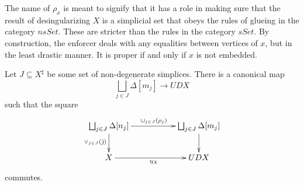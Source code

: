 The name of $\rho _x$ is meant to signify that it has a role in making sure that the result of desingularizing $X$ is a simplicial set that obeys the rules of glueing in the category $nsSet$. These are stricter than the rules in the category $sSet$. By construction, the enforcer deals with any equalities between vertices of $x$, but in the least drastic manner. It is proper if and only if $x$ is not embedded.
\begin{proposition}\label{prop:role_of_enforcers}
Let $J\subseteq X^\sharp$ be some set of non-degenerate simplices. There is a canonical map
\[\bigsqcup _{j\in J}\Delta [m_j]\to UDX\]
such that the square
\begin{equation}
\label{eq:first_diagram_proof_prop_role_of_enforcers}
\begin{gathered}
\xymatrix{
\bigsqcup _{j\in J}\Delta [n_j] \ar[rr]^{\sqcup _{j\in J}(\rho _j)} \ar[d]_{\vee _{j\in J}(\bar{\jmath } )} && \bigsqcup _{j\in J}\Delta [m_j] \ar[d] \\ 
X \ar[rr]_{\eta _X} && UDX
}
\end{gathered}
\end{equation}
commutes.
\end{proposition}
